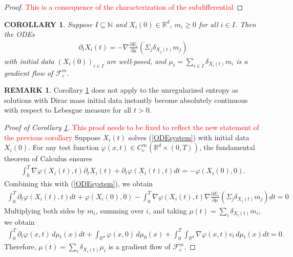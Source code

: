 \documentclass[11pt,leqno]{amsart}
\newtheorem{cor}[thm]{COROLLARY}
\theoremstyle{definition}
\newtheorem{remark}[thm]{REMARK}
\newcommand{\Rd}{{\mathord{\mathbb R}^d}}
\newcommand{\N}{{\mathord{\mathbb N}}}
\newcommand{\grad}{\nabla}
\newcommand{\F}{\mathcal{F}}
\def\e{\varepsilon}
\def\F{\mathcal{F}}
\begin{document}
\begin{proof}
\textcolor{red}{This is a consequence of the characterization of the subdifferential}
\end{proof}

\begin{cor} \label{particles well posed}
Suppose $I \subseteq \N$ and $X_i(0) \in \Rd$, $m_i \geq 0$ for all $i \in I$. Then the ODEs
\begin{align} \label{ODEsystem}
\partial_t X_i(t) =- \grad \frac{\partial E_\e}{\partial \mu} (\Sigma_j \delta_{X_j(t)} m_j ) 
\end{align}
with initial data $(X_i(0))_{i \in I}$ are well-posed, and $\mu_t = \sum_{i \in I} \delta_{X_i(t)} m_i$ is a gradient flow of $\F_\e^m$.
\end{cor}


\begin{remark}
Corollary \ref{particles well posed} does not apply to the unregularized entropy as solutions with Dirac mass initial data instantly become absolutely continuous with respect to Lebesgue measure for all $t>0$.
\end{remark}

\begin{proof}[Proof of Corollary \ref{particles well posed}]
\textcolor{red}{This proof needs to be fixed to reflect the new statement of the previous corollary}
Suppose $X_i(t)$ solves (\ref{ODEsystem}) with initial data $X_i(0)$. For any test function $\varphi(x,t) \in C^\infty_c(\Rd \times (0,T))$, the fundamental theorem of Calculus ensures \begin{align*}
\int_0^T \grad \varphi(X_i(t),t) \partial_t X_i(t) + \partial_t \varphi( X_i(t),t) dt = -\varphi(X_i(0),0).
\end{align*}
Combining this with (\ref{ODEsystem}), we obtain
\begin{align*}
 \int_0^{T} \partial_t \varphi(X_i(t),t) dt  + \varphi(X_i(0),0) - \int_0^{T} \grad \varphi(X_i(t),t) \grad \frac{\partial E_\e}{\partial \mu} (\Sigma_j \delta_{X_j(t)} m_j)  dt = 0
\end{align*}
Multiplying both sides by $m_i$, summing over $i$, and taking $\mu(t) = \sum_i \delta_{X_i(t)} m_i$, we obtain
\begin{align*}
\int_0^{T} \partial_t \varphi(x,t)\,d \mu_t(x) dt + \int_\Rd \varphi(x,0)\,d \mu_0(x) +\int_0^{T} \int_{\Rd} \grad \varphi(x,t) v_t\,d \mu_t(x) dt  =0.
\end{align*}
Therefore, $\mu(t) = \sum_i \delta_{X_i(t)} \mu_i$ is a gradient flow of $\F_\e^m$.
\end{proof}
\end{document}
